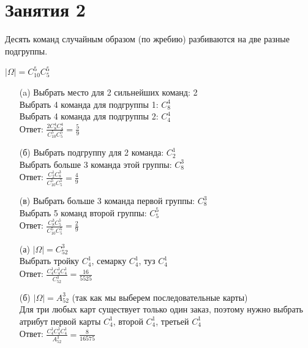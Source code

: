 \section*{Занятия 2}
\begin{exercise}[1] Десять команд случайным образом (по жребию) разбиваются на две разные подгруппы. 
	
	$| \Omega | = C^5_{10} C^5_5$
	
	\begin{enumerate}
		\item [(a)] Выбрать место для 2 сильнейших команд: 2 \\ Выбрать 4 команда для подгруппы 1: $C^4_8$ \\ Выбрать 4 команда для подгруппы 2: $C^4_4$ \\ Ответ: $\frac{2 C^4_8 C^4_4}{C^5_{10} C^5_5} = \frac{5}{9}$
		\item [(б)] Выбрать подгруппу для 2 команда: $C^1_2$ \\ Выбрать больше 3 команда этой группы: $C^3_8$ \\ Ответ: $\frac{C^1_2 C^3_8}{C^5_{10} C^5_5} = \frac{4}{9}$
		\item [(в)] Выбрать больше 3 команда первой группы: $C^3_8$ \\ Выбрать 5 команд второй группы: $C^5_5$ \\ Ответ: $\frac{C^3_8 C^5_5}{C^5_{10} C^5_5} = \frac{2}{9}$
	\end{enumerate}
\end{exercise}

\begin{exercise}[2]
	\begin{enumerate}
		\item [(а)] $| \Omega | = C^3_{52}$ \\ Выбрать тройку $C^1_4$, семарку $C^1_4$, туз $C^1_4$ \\ Ответ: $\frac{C^1_4 C^1_4 C^1_4}{C^3_{52}} = \frac{16}{5525}$
		\item [(б)] $| \Omega | = A^3_{52}$ (так как мы выберем последовательные карты) \\ Для три любых карт существует только один заказ, поэтому нужно выбрать атрибут первой карты $C^1_4$, второй $C^1_4$, третьей $C^1_4$ \\ Ответ: $\frac{C^1_4 C^1_4 C^1_4}{A^3_{52}} = \frac{8}{16575}$
	\end{enumerate}
\end{exercise}

